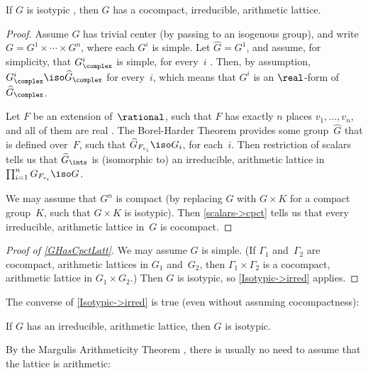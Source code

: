 \begin{cor} \label{Isotypic->irred}
If $G$ is isotypic , then $G$ has a cocompact, irreducible, arithmetic lattice.
 \end{cor}
 
 \begin{proof}
 Assume $G$ has trivial center (by passing to an isogenous group), and write $G = G^1 \times \cdots \times G^n$, where each $G^i$ is simple.  
Let $\widehat G = G^1$,
 and assume, for simplicity, that $G^i_{\complex}$ is simple, for every~$i$ . Then, by assumption, $G^i_{\complex} \iso \widehat G_\complex$ for every~$i$, which means that $G^i$ is an $\real$-form of $\widehat G_\complex$. 

Let $F$ be an extension of~$\rational$, such that $F$ has exactly $n$ places $v_1,\ldots,v_n$, and all of them are real . The Borel-Harder Theorem  provides some group~$\widehat G$ that is defined over~$F$, such that $\widehat G_{F_{v_i}} \iso G_i$, for each~$i$. Then restriction of scalars  tells us that $\widehat G_{\ints}$ is (isomorphic to) an irreducible, arithmetic lattice in $\prod_{i=1}^n G_{F_{v_i}} \iso G$.

We may assume that $G^n$ is compact (by replacing $G$ with $G \times K$ for a compact group~$K$, such that $G \times K$ is isotypic). Then \cref{scalars->cpct} tells us that every irreducible, arithmetic lattice in~$G$ is cocompact.
 \end{proof}

\begin{proof}[Proof of \cref{GHasCpctLatt}]
 We may assume $G$ is simple. (If $\Gamma_1$ and~$\Gamma_2$
are cocompact, arithmetic lattices in $G_1$ and~$G_2$, then
$\Gamma_1 \times \Gamma_2$ is a cocompact, arithmetic
lattice in $G_1 \times G_2$.) Then $G$ is isotypic, so
\cref{Isotypic->irred} applies.
 \end{proof}

The converse of \cref{Isotypic->irred} is true (even without assuming cocompactness):

\begin{prop} \label{Irred->Isotypic}
If $G$ has an irreducible, arithmetic lattice, then $G$ is isotypic.
\end{prop}

By the Margulis Arithmeticity Theorem , there is usually no need to assume that the lattice is arithmetic:

